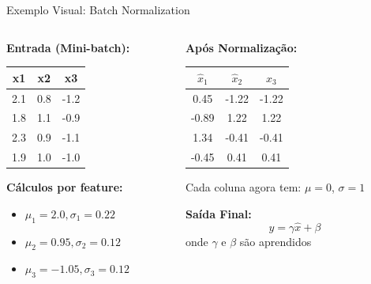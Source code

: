 \documentclass{beamer}
\begin{document}
\begin{frame}{Exemplo Visual: Batch Normalization}

\begin{columns}[T]
\begin{column}{0.48\textwidth}
\textbf{Entrada (Mini-batch):}
\vspace{0.3cm}

\begin{tabular}{|c|c|c|}
\hline
\textbf{x1} & \textbf{x2} & \textbf{x3} \\
\hline
2.1 & 0.8 & -1.2 \\
1.8 & 1.1 & -0.9 \\
2.3 & 0.9 & -1.1 \\
1.9 & 1.0 & -1.0 \\
\hline
\end{tabular}

\vspace{0.5cm}
\textbf{Cálculos por feature:}
\begin{itemize}
    \item $\mu_1 = 2.0, \sigma_1 = 0.22$
    \item $\mu_2 = 0.95, \sigma_2 = 0.12$  
    \item $\mu_3 = -1.05, \sigma_3 = 0.12$
\end{itemize}
\end{column}

\begin{column}{0.48\textwidth}
\textbf{Após Normalização:}
\vspace{0.3cm}

\begin{tabular}{|c|c|c|}
\hline
\textbf{$\hat{x}_1$} & \textbf{$\hat{x}_2$} & \textbf{$\hat{x}_3$} \\
\hline
0.45 & -1.22 & -1.22 \\
-0.89 & 1.22 & 1.22 \\
1.34 & -0.41 & -0.41 \\
-0.45 & 0.41 & 0.41 \\
\hline
\end{tabular}

\vspace{0.3cm}
\small Cada coluna agora tem: $\mu = 0$, $\sigma = 1$

\vspace{0.5cm}
\textbf{Saída Final:}
$$y = \gamma \hat{x} + \beta$$
onde $\gamma$ e $\beta$ são aprendidos
\end{column}
\end{columns}

\end{frame}
\end{document}
